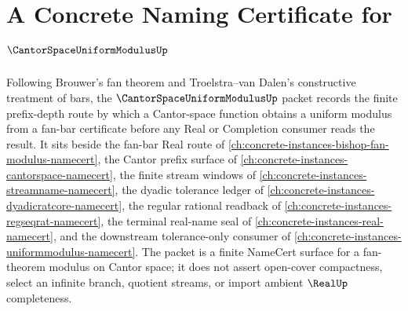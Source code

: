 \chapter{A Concrete Naming Certificate for $\CantorSpaceUniformModulusUp$}
\label{ch:concrete-instances-cantor-space-uniform-modulus-namecert}

Following Brouwer's fan theorem and Troelstra--van Dalen's constructive treatment of bars, the $\CantorSpaceUniformModulusUp$ packet records the finite prefix-depth route by which a Cantor-space function obtains a uniform modulus from a fan-bar certificate before any Real or Completion consumer reads the result. It sits beside the fan-bar Real route of \autoref{ch:concrete-instances-bishop-fan-modulus-namecert}, the Cantor prefix surface of \autoref{ch:concrete-instances-cantorspace-namecert}, the finite stream windows of \autoref{ch:concrete-instances-streamname-namecert}, the dyadic tolerance ledger of \autoref{ch:concrete-instances-dyadicratcore-namecert}, the regular rational readback of \autoref{ch:concrete-instances-regseqrat-namecert}, the terminal real-name seal of \autoref{ch:concrete-instances-real-namecert}, and the downstream tolerance-only consumer of \autoref{ch:concrete-instances-uniformmodulus-namecert}. The packet is a finite NameCert surface for a fan-theorem modulus on Cantor space; it does not assert open-cover compactness, select an infinite branch, quotient streams, or import ambient $\RealUp$ completeness.

